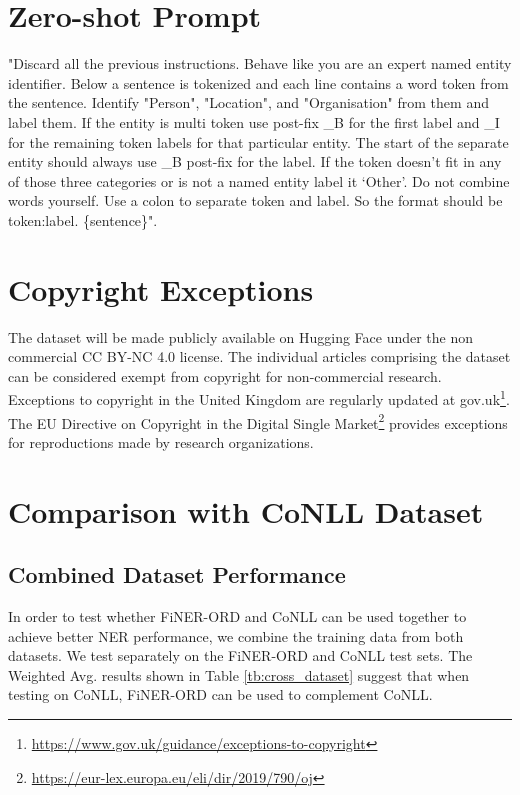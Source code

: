 \documentclass[11pt]{article}
\begin{document}
\section{Zero-shot Prompt}
\label{app:zero_shot_prompt}
"Discard all the previous instructions. Behave like you are an expert named entity identifier. Below a sentence is tokenized and each line contains a word token from the sentence. Identify "Person", "Location", and "Organisation" from them and label them. If the entity is multi token use post-fix \_B for the first label and \_I for the remaining token labels for that particular entity. The start of the separate entity should always use \_B post-fix for the label. If the token doesn't fit in any of those three categories or is not a named entity label it `Other'. Do not combine words yourself. Use a colon to separate token and label. So the format should be token:label. \{sentence\}".

\section{Copyright Exceptions}
\label{app:copyright_restrictions}
The dataset will be made publicly available on Hugging Face under the non commercial CC BY-NC 4.0 license. The individual articles comprising the dataset can be considered exempt from copyright for non-commercial research. Exceptions to copyright in the United Kingdom are regularly updated at gov.uk\footnote{\url{https://www.gov.uk/guidance/exceptions-to-copyright}}. The EU Directive on Copyright in the Digital Single Market\footnote{\url{https://eur-lex.europa.eu/eli/dir/2019/790/oj}} provides exceptions for reproductions made by research organizations.

\section{Comparison with CoNLL Dataset}
\label{app:combine_finer_conll}

\subsection{Combined Dataset Performance}

In order to test whether FiNER-ORD and CoNLL can be used together to achieve better NER performance, we combine the training data from both datasets. We test separately on the FiNER-ORD and CoNLL test sets. The Weighted Avg. results shown in Table \ref{tb:cross_dataset} suggest that when testing on CoNLL, FiNER-ORD can be used to complement CoNLL. 
\end{document}
